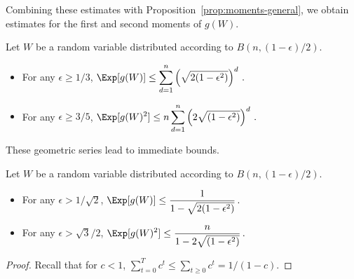 Combining these estimates with Proposition~\ref{prop:moments-general}, we obtain estimates for the first and second moments of $g(W)$. 
\begin{corollary}
  Let $W$ be a random variable distributed according to $B(n,(1-\epsilon)/2)$.
  \begin{itemize}
  \item For any $\epsilon \geq 1/3$, \quad $\displaystyle \Exp[g(W)] \leq \sum_{d=1}^n \left(\sqrt{2(1 - \epsilon^2)}\right)^d\,.$
  \item For any $\epsilon \geq 3/5$, \quad $\displaystyle
    \Exp[g(W)^2] \leq n \sum_{d=1}^n \left(2\sqrt{(1 - \epsilon^2)}\right)^d\,.$
  \end{itemize}
\end{corollary}


These geometric series lead to immediate bounds. 
\begin{corollary} Let $W$ be a random variable distributed according to $B(n,(1-\epsilon)/2)$.
  \begin{itemize}
  \item For any $\epsilon > 1/\sqrt{2}$, \quad
    $\displaystyle
      \Exp[g(W)] \leq \frac{1}{1 - \sqrt{2(1 - \epsilon^2)}}\,.$
  \item For any $\epsilon > \sqrt{3}/2$, \quad $\displaystyle \Exp[g(W)^2] \leq \frac{n}{1 - 2\sqrt{(1 - \epsilon^2)}}\,.$
  \end{itemize}
\end{corollary}

\begin{proof}
  Recall that for $c < 1$, $\sum_{t = 0}^T c^t \leq \sum_{t \geq 0} c^t = 1/(1 - c)$.
\end{proof}

